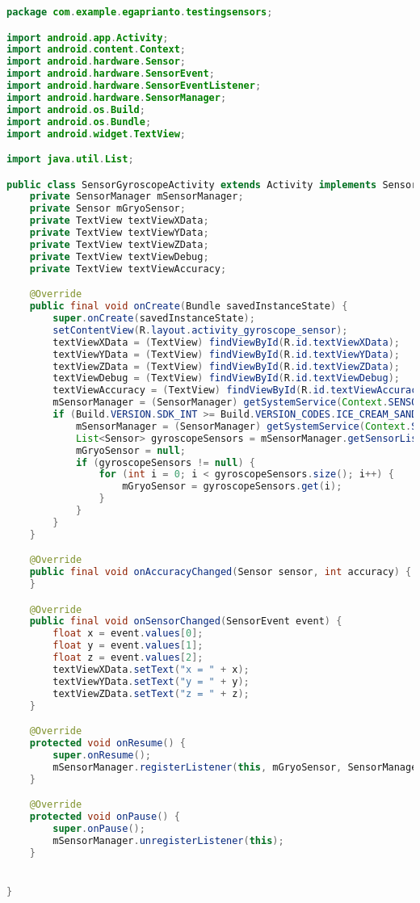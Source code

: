 \begin{lstlisting}[language=Java,basicstyle=\tiny,caption=SensorGyroscopeActivity.java]
package com.example.egaprianto.testingsensors;

import android.app.Activity;
import android.content.Context;
import android.hardware.Sensor;
import android.hardware.SensorEvent;
import android.hardware.SensorEventListener;
import android.hardware.SensorManager;
import android.os.Build;
import android.os.Bundle;
import android.widget.TextView;

import java.util.List;

public class SensorGyroscopeActivity extends Activity implements SensorEventListener {
    private SensorManager mSensorManager;
    private Sensor mGryoSensor;
    private TextView textViewXData;
    private TextView textViewYData;
    private TextView textViewZData;
    private TextView textViewDebug;
    private TextView textViewAccuracy;

    @Override
    public final void onCreate(Bundle savedInstanceState) {
        super.onCreate(savedInstanceState);
        setContentView(R.layout.activity_gyroscope_sensor);
        textViewXData = (TextView) findViewById(R.id.textViewXData);
        textViewYData = (TextView) findViewById(R.id.textViewYData);
        textViewZData = (TextView) findViewById(R.id.textViewZData);
        textViewDebug = (TextView) findViewById(R.id.textViewDebug);
        textViewAccuracy = (TextView) findViewById(R.id.textViewAccuracy);
        mSensorManager = (SensorManager) getSystemService(Context.SENSOR_SERVICE);
        if (Build.VERSION.SDK_INT >= Build.VERSION_CODES.ICE_CREAM_SANDWICH_MR1) {
            mSensorManager = (SensorManager) getSystemService(Context.SENSOR_SERVICE);
            List<Sensor> gyroscopeSensors = mSensorManager.getSensorList(Sensor.TYPE_GYROSCOPE);
            mGryoSensor = null;
            if (gyroscopeSensors != null) {
                for (int i = 0; i < gyroscopeSensors.size(); i++) {
                    mGryoSensor = gyroscopeSensors.get(i);
                }
            }
        }
    }

    @Override
    public final void onAccuracyChanged(Sensor sensor, int accuracy) {
    }

    @Override
    public final void onSensorChanged(SensorEvent event) {
        float x = event.values[0];
        float y = event.values[1];
        float z = event.values[2];
        textViewXData.setText("x = " + x);
        textViewYData.setText("y = " + y);
        textViewZData.setText("z = " + z);
    }

    @Override
    protected void onResume() {
        super.onResume();
        mSensorManager.registerListener(this, mGryoSensor, SensorManager.SENSOR_DELAY_NORMAL);
    }

    @Override
    protected void onPause() {
        super.onPause();
        mSensorManager.unregisterListener(this);
    }


}
\end{lstlisting}